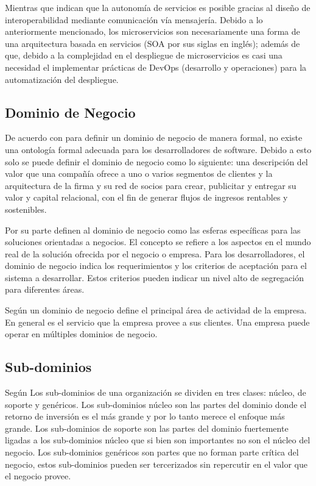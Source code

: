 Mientras que \cite{nadareishvili2016microservice} indican que la autonomía de servicios es posible
gracias al diseño de interoperabilidad mediante comunicación vía mensajería.
Debido a lo anteriormente mencionado, los microservicios son necesariamente una forma de una
arquitectura basada en servicios (SOA por sus siglas en inglés); además de que, debido a la
complejidad en el despliegue de microservicios es casi una necesidad el implementar prácticas de
DevOps (desarrollo y operaciones) para la automatización del despliegue.


\subsection{Dominio de Negocio}

De acuerdo con \cite{bosselmann2014domain} para definir un dominio de negocio de manera formal,
no existe una ontología formal adecuada para los desarrolladores de software.
Debido a esto solo se puede definir el dominio de negocio como lo siguiente: una descripción
del valor que una compañía ofrece a uno o varios segmentos de clientes y la arquitectura de
la firma y su red de socios para crear, publicitar y entregar su valor y capital relacional,
con el fin de generar flujos de ingresos rentables y sostenibles.

Por su parte \cite{heidari2021ontology} definen al dominio de negocio como las esferas específicas
para las soluciones orientadas a negocios.
El concepto se refiere a los aspectos en el mundo real de la solución ofrecida por el negocio o empresa.
Para los desarrolladores, el dominio de negocio indica los requerimientos y los criterios de aceptación
para el sistema a desarrollar.
Estos criterios pueden indicar un nivel alto de segregación para diferentes áreas.

Según \cite{khononov2021learning} un dominio de negocio define el principal área de actividad de
la empresa. En general es el servicio que la empresa provee a sus clientes.
Una empresa puede operar en múltiples dominios de negocio.

\subsection{Sub-dominios}

Según \cite{richardson2018microservices} Los sub-dominios de una organización se dividen en tres clases:
núcleo, de soporte y genéricos.
Los sub-dominios núcleo son las partes del dominio donde el retorno de inversión es el más grande y
por lo tanto merece el enfoque más grande.
Los sub-dominios de soporte son las partes del dominio fuertemente ligadas a los sub-dominios núcleo
que si bien son importantes no son el núcleo del negocio.
Los sub-dominios genéricos son partes que no forman parte crítica del negocio, estos sub-dominios
pueden ser tercerizados sin repercutir en el valor que el negocio provee.


